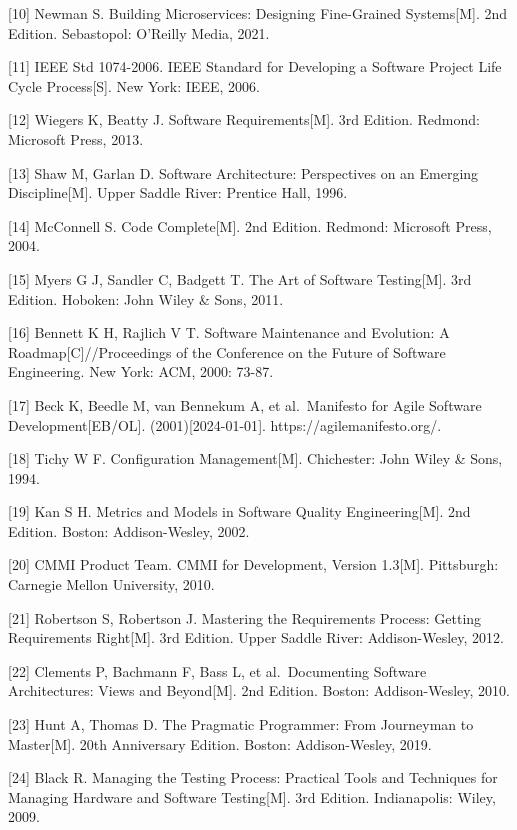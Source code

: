 {[}10{]} Newman S. Building Microservices: Designing Fine-Grained Systems{[}M{]}. 2nd Edition. Sebastopol: O'Reilly Media, 2021.

{[}11{]} IEEE Std 1074-2006. IEEE Standard for Developing a Software Project Life Cycle Process{[}S{]}. New York: IEEE, 2006.

{[}12{]} Wiegers K, Beatty J. Software Requirements{[}M{]}. 3rd Edition. Redmond: Microsoft Press, 2013.

{[}13{]} Shaw M, Garlan D. Software Architecture: Perspectives on an Emerging Discipline{[}M{]}. Upper Saddle River: Prentice Hall, 1996.

{[}14{]} McConnell S. Code Complete{[}M{]}. 2nd Edition. Redmond: Microsoft Press, 2004.

{[}15{]} Myers G J, Sandler C, Badgett T. The Art of Software Testing{[}M{]}. 3rd Edition. Hoboken: John Wiley \& Sons, 2011.

{[}16{]} Bennett K H, Rajlich V T. Software Maintenance and Evolution: A Roadmap{[}C{]}//Proceedings of the Conference on the Future of Software Engineering. New York: ACM, 2000: 73-87.

{[}17{]} Beck K, Beedle M, van Bennekum A, et al.~Manifesto for Agile Software Development{[}EB/OL{]}. (2001){[}2024-01-01{]}. https://agilemanifesto.org/.

{[}18{]} Tichy W F. Configuration Management{[}M{]}. Chichester: John Wiley \& Sons, 1994.

{[}19{]} Kan S H. Metrics and Models in Software Quality Engineering{[}M{]}. 2nd Edition. Boston: Addison-Wesley, 2002.

{[}20{]} CMMI Product Team. CMMI for Development, Version 1.3{[}M{]}. Pittsburgh: Carnegie Mellon University, 2010.

{[}21{]} Robertson S, Robertson J. Mastering the Requirements Process: Getting Requirements Right{[}M{]}. 3rd Edition. Upper Saddle River: Addison-Wesley, 2012.

{[}22{]} Clements P, Bachmann F, Bass L, et al.~Documenting Software Architectures: Views and Beyond{[}M{]}. 2nd Edition. Boston: Addison-Wesley, 2010.

{[}23{]} Hunt A, Thomas D. The Pragmatic Programmer: From Journeyman to Master{[}M{]}. 20th Anniversary Edition. Boston: Addison-Wesley, 2019.

{[}24{]} Black R. Managing the Testing Process: Practical Tools and Techniques for Managing Hardware and Software Testing{[}M{]}. 3rd Edition. Indianapolis: Wiley, 2009.

